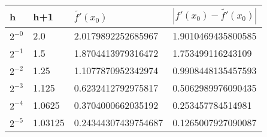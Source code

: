 \documentclass{article}
\begin{document}
\begin{table}[h!]
    \centering
    \begin{tabular}{|l|l|l|l|}
    \hline
    h  & h+1 & \( \widetilde{f'}(x_{0})\) & \( |f'(x_{0}) - \widetilde{f'}(x_{0}) | \) \\
    \hline
    \(2^{-0}\)&2.0&2.0179892252685967&1.9010469435800585\\
    \(2^{-1}\)&1.5&1.8704413979316472&1.753499116243109\\
    \(2^{-2}\)&1.25&1.1077870952342974&0.9908448135457593\\
    \(2^{-3}\)&1.125&0.6232412792975817&0.5062989976090435\\
    \(2^{-4}\)&1.0625&0.3704000662035192&0.253457784514981\\
    \(2^{-5}\)&1.03125&0.24344307439754687&0.1265007927090087\\

\end{tabular}
\end{table}
\end{document}
